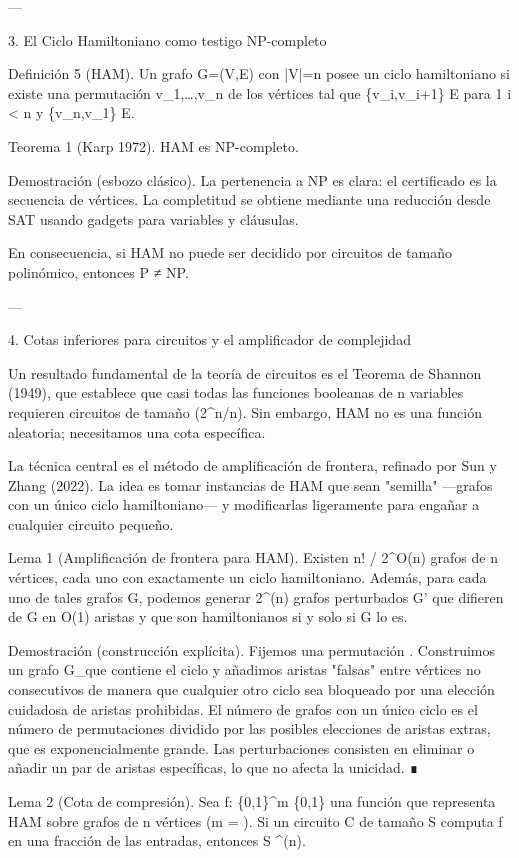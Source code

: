 \documentclass[12pt,twoside]{book}
\begin{document}
---

3. El Ciclo Hamiltoniano como testigo NP-completo

Definición 5 (HAM). Un grafo G=(V,E) con |V|=n posee un ciclo hamiltoniano si existe una permutación v_1,\dots,v_n de los vértices tal que \{v_i,v_{i+1}\} \in E para 1 \le i < n y \{v_n,v_1\} \in E.

Teorema 1 (Karp 1972). HAM es NP-completo.

Demostración (esbozo clásico). La pertenencia a NP es clara: el certificado es la secuencia de vértices. La completitud se obtiene mediante una reducción desde SAT usando gadgets para variables y cláusulas.

En consecuencia, si HAM no puede ser decidido por circuitos de tamaño polinómico, entonces P ≠ NP.

---

4. Cotas inferiores para circuitos y el amplificador de complejidad

Un resultado fundamental de la teoría de circuitos es el Teorema de Shannon (1949), que establece que casi todas las funciones booleanas de n variables requieren circuitos de tamaño \Omega(2^n/n). Sin embargo, HAM no es una función aleatoria; necesitamos una cota específica.

La técnica central es el método de amplificación de frontera, refinado por Sun y Zhang (2022). La idea es tomar instancias de HAM que sean "semilla" —grafos con un único ciclo hamiltoniano— y modificarlas ligeramente para engañar a cualquier circuito pequeño.

Lema 1 (Amplificación de frontera para HAM). Existen \ge n! / 2^{O(n)} grafos de n vértices, cada uno con exactamente un ciclo hamiltoniano. Además, para cada uno de tales grafos G, podemos generar 2^{\Omega(n)} grafos perturbados G' que difieren de G en O(1) aristas y que son hamiltonianos si y solo si G lo es.

Demostración (construcción explícita). Fijemos una permutación \sigma. Construimos un grafo G_\sigma que contiene el ciclo \sigma y añadimos aristas "falsas" entre vértices no consecutivos de manera que cualquier otro ciclo sea bloqueado por una elección cuidadosa de aristas prohibidas. El número de grafos con un único ciclo es el número de permutaciones dividido por las posibles elecciones de aristas extras, que es exponencialmente grande. Las perturbaciones consisten en eliminar o añadir un par de aristas específicas, lo que no afecta la unicidad. ∎

Lema 2 (Cota de compresión). Sea f: \{0,1\}^m \to \{0,1\} una función que representa HAM sobre grafos de n vértices (m = ). Si un circuito C de tamaño S computa f en una fracción \delta de las entradas, entonces S \ge \delta {}^{\Omega(n)}.
\end{document}
